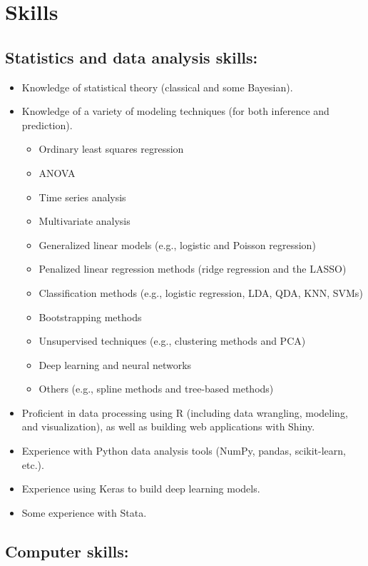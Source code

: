 \documentclass[letterpaper,12pt]{article}
\begin{document}
\section*{Skills}

\subsection*{Statistics and data analysis skills:}

\begin{itemize}
\item Knowledge of statistical theory (classical and some Bayesian).
\item Knowledge of a variety of modeling techniques (for both
  inference and prediction).
\begin{itemize}
\item Ordinary least squares regression
\item ANOVA
\item Time series analysis
\item Multivariate analysis
\item Generalized linear models (e.g., logistic and Poisson
  regression)
\item Penalized linear regression methods (ridge regression and the
  LASSO)
\item Classification methods (e.g., logistic regression, LDA, QDA,
  KNN, SVMs)
\item Bootstrapping methods
\item Unsupervised techniques (e.g., clustering methods and PCA)
\item Deep learning and neural networks
\item Others (e.g., spline methods and tree-based methods)
\end{itemize}
\item Proficient in data processing using R (including data wrangling,
  modeling, and visualization), as well as building web applications
  with Shiny.
\item Experience with Python data analysis tools (NumPy, pandas,
  scikit-learn, etc.).
\item Experience using Keras to build deep learning models.
\item Some experience with Stata.
\end{itemize}

\subsection*{Computer skills:}
\end{document}
